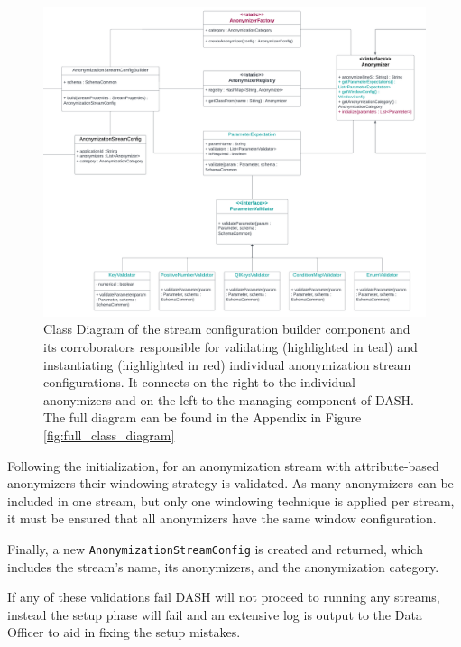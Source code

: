 \begin{figure}[H]
   \begin{adjustbox}{center}
   \includegraphics[width=0.85\pdfpagewidth]{img/Stream_Config_Builder.pdf}
   \end{adjustbox}
   \caption[Class diagram of the configuration builder component of \ac{DASH}]{Class Diagram of the stream configuration builder component and its corroborators responsible for validating (highlighted in teal) and instantiating (highlighted in red) individual anonymization stream configurations. It connects on the right to the individual anonymizers and on the left to the managing component of \ac{DASH}. The full diagram can be found in the Appendix in Figure \ref{fig:full_class_diagram}\label{fig:stream_config_builder}}
\end{figure}

Following the initialization, for an anonymization stream with attribute-based anonymizers their windowing strategy is validated. As many anonymizers can be included in one stream, but only one windowing technique is applied per stream, it must be ensured that all anonymizers have the same window configuration. \par
Finally, a new \texttt{AnonymizationStreamConfig} is created and returned, which includes the stream's name, its anonymizers, and the anonymization category. \par
If any of these validations fail \ac{DASH} will not proceed to running any streams, instead the setup phase will fail and an extensive log is output to the Data Officer to aid in fixing the setup mistakes. 

